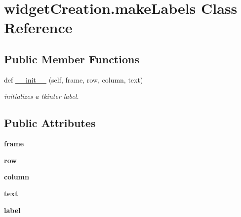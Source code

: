 \hypertarget{classwidget_creation_1_1make_labels}{}\section{widget\+Creation.\+make\+Labels Class Reference}
\label{classwidget_creation_1_1make_labels}
\subsection*{Public Member Functions}
\begin{DoxyCompactItemize}
\item 
def \hyperlink{classwidget_creation_1_1make_labels_a86db2b4904abbedc0933e73e60ceda29}{\+\_\+\+\_\+init\+\_\+\+\_\+} (self, frame, row, column, text)
\begin{DoxyCompactList}\small\item\em initializes a tkinter label. \end{DoxyCompactList}\end{DoxyCompactItemize}
\subsection*{Public Attributes}
\begin{DoxyCompactItemize}
\item 
\mbox{\label{classwidget_creation_1_1make_labels_a51095100c590b5d22f1f4cab559c3895}} 
{\bfseries frame}
\item 
\mbox{\label{classwidget_creation_1_1make_labels_a0ed71ca507bb81df44c36331b84aba94}} 
{\bfseries row}
\item 
\mbox{\label{classwidget_creation_1_1make_labels_a3f8f99f827f9ee0d0f2ce68364d2fa23}} 
{\bfseries column}
\item 
\mbox{\label{classwidget_creation_1_1make_labels_a16f1c5dc51d69d276957a71ab194da69}} 
{\bfseries text}
\item 
\mbox{\label{classwidget_creation_1_1make_labels_a6beeeaf8ece7d818bd53fe5546381842}} 
{\bfseries label}
\end{DoxyCompactItemize}


